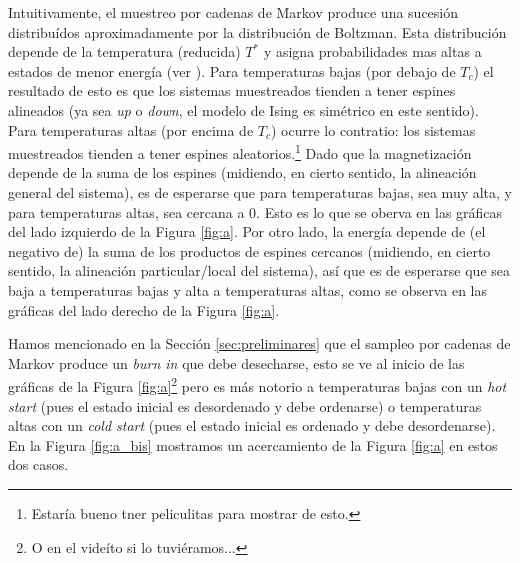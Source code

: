 \documentclass[a4paper,12pt]{article}
\begin{document}
Intuitivamente, el muestreo por cadenas de Markov produce una sucesión distribuídos aproximadamente por la distribución de Boltzman. Esta distribución depende de la temperatura (reducida) $T^*$ y asigna probabilidades mas altas a estados de menor energía (ver \cite{phillies2000elementary}). Para temperaturas bajas (por debajo de $T_c$) el resultado de esto es que los sistemas muestreados tienden a tener espines alineados (ya sea {\it up} o {\it down}, el modelo de Ising es simétrico en este sentido). Para temperaturas altas (por encima de $T_c$) ocurre lo contratio: los sistemas muestreados tienden a tener espines aleatorios.\footnote{Estaría bueno tner peliculitas para mostrar de esto.} Dado que la magnetización depende de la suma de los espines (midiendo, en cierto sentido, la alineación general del sistema), es de esperarse que para temperaturas bajas, sea muy alta, y para temperaturas altas, sea cercana a 0. Esto es lo que se oberva en las gráficas del lado izquierdo de la Figura \ref{fig:a}. Por otro lado, la energía depende de (el negativo de) la suma de los productos de espines cercanos (midiendo, en cierto sentido, la alineación particular/local del sistema), así que es de esperarse que sea baja a temperaturas bajas y alta a temperaturas altas, como se observa en las gráficas del lado derecho de la Figura \ref{fig:a}.

Hamos mencionado en la Sección \ref{sec:preliminares} que el sampleo por cadenas de Markov produce un {\it burn in} que debe desecharse, esto se ve al inicio de las gráficas de la Figura \ref{fig:a}\footnote{O en el videíto si lo tuviéramos...} pero es más notorio a temperaturas bajas con un {\it hot start} (pues el estado inicial es desordenado y debe ordenarse) o temperaturas altas con un {\it cold start} (pues el estado inicial es ordenado y debe desordenarse). En la Figura \ref{fig:a_bis} mostramos un acercamiento de la Figura \ref{fig:a} en estos dos casos.
\end{document}
